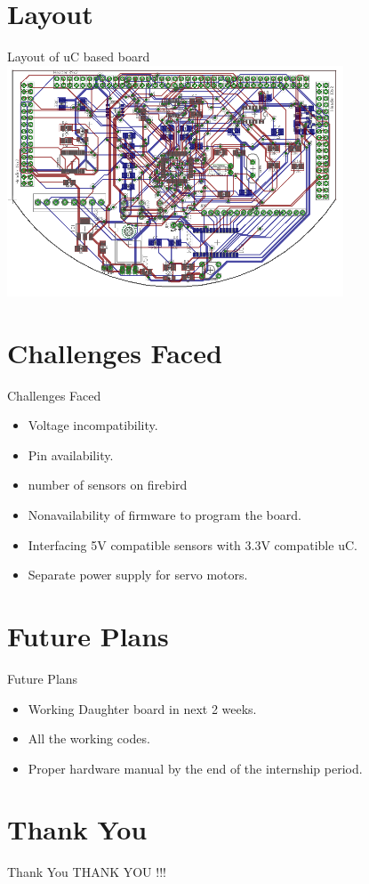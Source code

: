 \documentclass[10pt, a4paper]{beamer}
\begin{document}
\section{Layout}
\begin{frame}{Layout of uC based board}
{\includegraphics[width=10cm]{7.PNG}}
\end{frame}

\section{Challenges Faced}
\begin{frame}{Challenges Faced}
	\begin{itemize}
		\item Voltage incompatibility.
		\item Pin availability.
		\item number of sensors on firebird
		\item Nonavailability of firmware to program the board.
		\item Interfacing 5V compatible sensors with 3.3V compatible uC.
		\item Separate power supply for servo motors.
	\end{itemize}
\end{frame}

\section{Future Plans}
\begin{frame}{Future Plans}
	\begin{itemize}
		\item Working Daughter board in next 2 weeks.
		\item All the  working codes.
		\item Proper hardware manual by the end of the internship period.   
	\end{itemize}
\end{frame}


\section{Thank You}
\begin{frame}{Thank You}
	\centering THANK YOU !!!
\end{frame}
\end{document}
